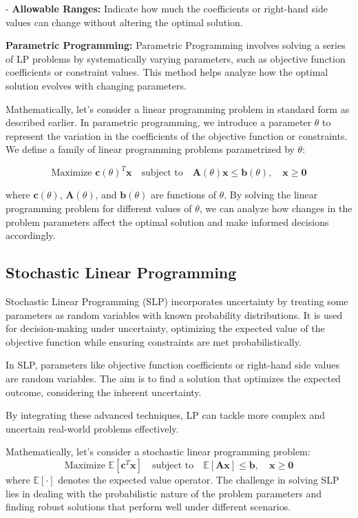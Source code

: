 \documentclass[12pt]{book} %
\begin{document}
- \textbf{Allowable Ranges:} Indicate how much the coefficients or right-hand side values can change without altering the optimal solution.


\textbf{Parametric Programming:}
Parametric Programming involves solving a series of LP problems by systematically varying parameters, such as objective function coefficients or constraint values. This method helps analyze how the optimal solution evolves with changing parameters.

Mathematically, let's consider a linear programming problem in standard form as described earlier. In parametric programming, we introduce a parameter $\theta$ to represent the variation in the coefficients of the objective function or constraints. We define a family of linear programming problems parametrized by $\theta$:

\[
\text{Maximize } \mathbf{c}(\theta)^T \mathbf{x} \quad \text{subject to} \quad \mathbf{A}(\theta)\mathbf{x} \leq \mathbf{b}(\theta), \quad \mathbf{x} \geq \mathbf{0}
\]

where $\mathbf{c}(\theta)$, $\mathbf{A}(\theta)$, and $\mathbf{b}(\theta)$ are functions of $\theta$. By solving the linear programming problem for different values of $\theta$, we can analyze how changes in the problem parameters affect the optimal solution and make informed decisions accordingly.

\subsection{Stochastic Linear Programming}

Stochastic Linear Programming (SLP) incorporates uncertainty by treating some parameters as random variables with known probability distributions. It is used for decision-making under uncertainty, optimizing the expected value of the objective function while ensuring constraints are met probabilistically.

In SLP, parameters like objective function coefficients or right-hand side values are random variables. The aim is to find a solution that optimizes the expected outcome, considering the inherent uncertainty.

By integrating these advanced techniques, LP can tackle more complex and uncertain real-world problems effectively.

Mathematically, let's consider a stochastic linear programming problem:
\[
\text{Maximize } \mathbb{E}[\mathbf{c}^T \mathbf{x}] \quad \text{subject to} \quad \mathbb{E}[\mathbf{Ax}] \leq \mathbf{b}, \quad \mathbf{x} \geq \mathbf{0}
\]
where $\mathbb{E}[\cdot]$ denotes the expected value operator. The challenge in solving SLP lies in dealing with the probabilistic nature of the problem parameters and finding robust solutions that perform well under different scenarios.
\end{document}
